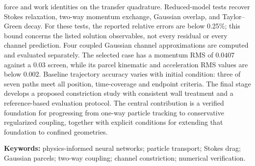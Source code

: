 \documentclass[12pt,a4paper,oneside]{report}
\begin{document}
force and work identities on the transfer quadrature. Reduced-model tests
recover Stokes relaxation, two-way momentum exchange, Gaussian overlap, and
Taylor--Green decay. For these tests, the reported relative errors are below
0.25\%; this bound concerns the listed solution observables, not every
residual or every channel prediction. Four coupled Gaussian channel
approximations are computed and evaluated separately. The selected case
has a momentum RMS of $0.0407$ against a $0.03$ screen, while its parcel
kinematic and acceleration RMS values are below $0.002$. Baseline trajectory
accuracy varies with initial condition: three of seven paths meet all
position, time-coverage and endpoint criteria. The final stage develops a
proposed constriction study with consistent wall treatment and a
reference-based evaluation protocol. The central contribution is a verified foundation for
progressing from one-way particle tracking to conservative regularized
coupling, together with explicit conditions for extending that foundation
to confined geometries.

\vspace{5mm}\noindent\textbf{Keywords:} physics-informed neural networks;
particle transport; Stokes drag; Gaussian parcels; two-way coupling;
channel constriction; numerical verification.
\end{document}
